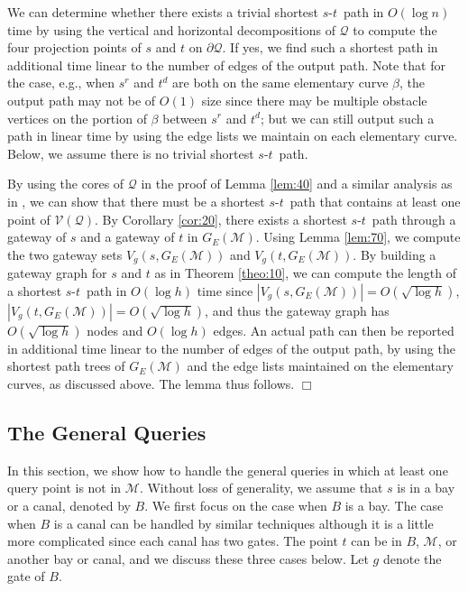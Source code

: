 \documentclass[english,runningheads,11pt]{llncs}
\def\calM{\mathcal{M}}
\def\calQ{\mathcal{Q}}
\def\calV{\mathcal{V}}
\def\st{$s$-$t$}
\newenvironment{proof}{\noindent {\textbf{Proof:}}\rm}{\hfill $\Box$\rm}
\begin{document}
\begin{proof}
We can determine whether there exists a trivial shortest \st\ path in
$O(\log n)$ time by using the vertical and horizontal decompositions of
$\calQ$ to compute the four projection points of $s$ and
$t$ on $\partial\calQ$. If yes, we find such a shortest path in
additional time linear to the number of edges of the output path. Note
that for the case, e.g., when $s^r$ and $t^d$ are both on the same elementary curve
$\beta$, the output path may not be of $O(1)$ size since there
may be multiple obstacle vertices on the portion of $\beta$ between $s^r$
and $t^d$; but we can still output such a path in linear time by using the
edge lists we maintain on each elementary curve.
Below, we assume there is no trivial shortest \st\ path.

By using the cores of $\calQ$ in the proof of Lemma \ref{lem:40} and
a similar analysis as in \cite{ref:ChenSh00}, we can show that
there must be a shortest \st\
path that contains at least one point of $\calV(\calQ)$. By
Corollary \ref{cor:20}, there exists a shortest \st\ path through a
gateway of $s$ and a gateway of $t$ in $G_E(\calM)$. Using Lemma \ref{lem:70}, we
compute the two gateway sets $V_g(s,G_E(\calM))$ and
$V_g(t,G_E(\calM))$. By building a gateway graph for $s$ and $t$ as
in Theorem \ref{theo:10}, we can compute the length of a
shortest \st\ path in $O(\log h)$ time since
$|V_g(s,G_E(\calM))|=O(\sqrt{\log h})$,
$|V_g(t,G_E(\calM))|=O(\sqrt{\log h})$, and thus
the gateway graph has $O(\sqrt{\log h})$ nodes and $O(\log h)$ edges.
An actual path can then be reported in additional time linear
to the number of edges of the output path, by using the shortest path
trees of $G_E(\calM)$ and the edge lists maintained on the elementary
curves, as discussed above.
The lemma thus follows.
\end{proof}




\subsection{The General Queries}
\label{subsec:general}

In this section, we show how to handle the general queries in which at least one query point
is not in $\calM$. Without loss of generality, we assume that $s$ is in
a bay or a canal, denoted by $B$. We first focus on the case when
$B$ is a bay. The case when $B$ is a canal can be handled by similar
techniques although it is a little more complicated since each canal
has two gates. The point $t$ can be in $B$, $\calM$,
or another bay or canal, and we discuss these three cases below.
Let $g$ denote the gate of $B$.
\end{document}
